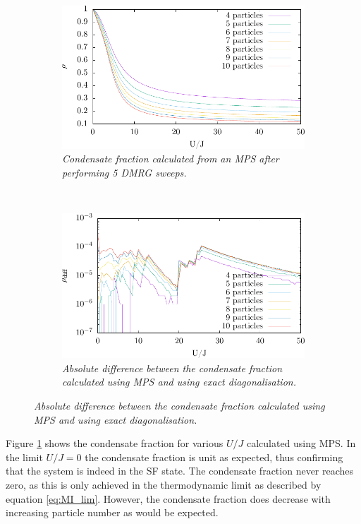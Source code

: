 \begin{figure}[h!]
    \centering
    \begin{subfigure}[t]{0.49\textwidth}
        \includegraphics[width=\textwidth]{Figures/Condfrac_4to10.pdf}
        \caption{\textit{Condensate fraction calculated from an MPS after performing 5 DMRG sweeps.}}
        \label{fig:Condfrac_4to10}
    \end{subfigure}
    ~
    \begin{subfigure}[t]{0.49\textwidth}
        \includegraphics[width=\textwidth]{Figures/Confrac_exactvsMPS.pdf}
        \caption{\textit{Absolute difference between the condensate fraction calculated using MPS and using exact diagonalisation.}}
        \label{fig:Condfrac_exactvsMPS}
    \end{subfigure}    
\end{figure}
Figure \ref{fig:Condfrac_4to10} shows the condensate fraction for various $U/J$ calculated using MPS. In the limit $U/J = 0$ the condensate fraction is unit as expected, thus confirming that the system is indeed in the SF state. The condensate fraction never reaches zero, as this is only achieved in the thermodynamic limit as described by equation \ref{eq:MI_lim}. However, the condensate fraction does decrease with increasing particle number as would be expected.\\
